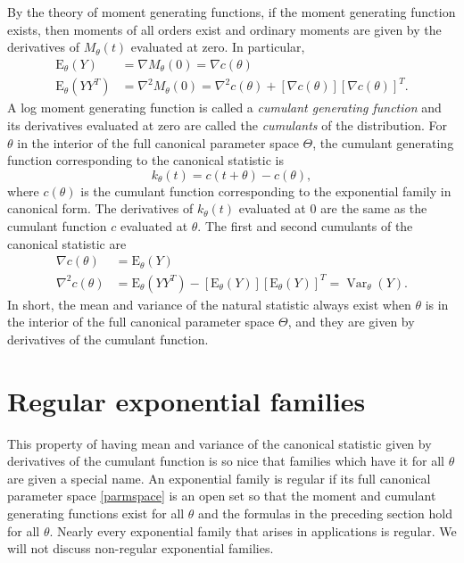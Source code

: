 \documentclass[12pt]{article}
\newcommand{\E}{\mathrm{E}}
\DeclareMathOperator{\E}{E}
\DeclareMathOperator{\Var}{Var}
\begin{document}
By the theory of moment generating functions, if the moment generating function exists, then moments of all orders exist and ordinary moments are given by the derivatives of $M_\theta(t)$ evaluated at zero. In particular,
\begin{align*}
  \E_\theta(Y) &= \nabla M_\theta(0) = \nabla c(\theta) \\	
  \E_\theta(YY^T) &= \nabla^2 M_\theta(0) = \nabla^2 c(\theta) + [\nabla c(\theta)][\nabla c(\theta)]^T.	  
\end{align*}
A log moment generating function is called a \emph{cumulant generating function} and its derivatives evaluated at zero are called the \emph{cumulants} of the distribution. For $\theta$ in the interior of the full canonical parameter space $\Theta$, the cumulant generating function corresponding to the canonical statistic is 
\begin{equation} \label{cgf}
  k_\theta(t) = c(t + \theta) - c(\theta),	
\end{equation}
  where $c(\theta)$ is the cumulant function corresponding to the exponential family in canonical form. The derivatives of $k_\theta(t)$ evaluated at 0 are the same as the cumulant function $c$ evaluated at $\theta$. The first and second cumulants of the canonical statistic are 
\begin{equation} \label{cumrel}
\begin{split}
	\nabla c(\theta) &= \E_\theta(Y) \\
	\nabla^2 c(\theta) &= \E_\theta(YY^T) - \left[\E_\theta(Y)\right]\left[\E_\theta(Y)\right]^T = \Var_\theta(Y).	
\end{split}
\end{equation}
In short, the mean and variance of the natural statistic always exist when $\theta$ is in the interior of the full canonical parameter space $\Theta$, and they are given by derivatives of the cumulant function.


\vspace{0.5cm}


\section*{Regular exponential families}


This property of having mean and variance of the canonical statistic given by derivatives of the cumulant function is so nice that families which have it for all $\theta$ are given a special name. An exponential family is regular if its full canonical parameter space \eqref{parmspace} is an open set so that the moment and cumulant generating functions exist for all $\theta$ and the formulas in the preceding section hold for all $\theta$. Nearly every exponential family that arises in applications is regular. We will not discuss non-regular exponential families.
\end{document}
